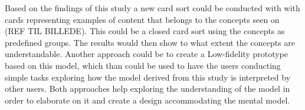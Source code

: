 Based on the findings of this study a new card sort could be conducted with with cards representing examples of content that belongs to the concepts seen on (REF TIL BILLEDE). This could be a closed card sort using the concepts as predefined groups. The results would then show to what extent the concepts are understandable. Another approach could be to create a Low-fidelity prototype based on this model, which than could be used to have the users conducting simple tasks exploring how the model derived from this study is interpreted by other users. Both approaches help exploring the understanding of the model in order to elaborate on it and create a design accommodating the mental model. 


